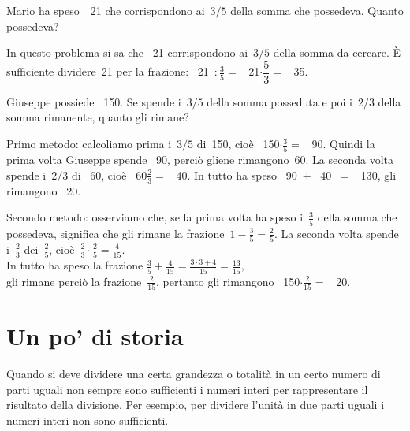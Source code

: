  \begin{esempio}{}{}
Mario ha speso~\officialeuro\ 21 che corrispondono ai~\(3/5\) della somma 
che possedeva. Quanto possedeva?

In questo problema si sa che \officialeuro\ 21 corrispondono ai~\(3/5\) della 
somma da cercare.
È sufficiente dividere~21 per la frazione:
\officialeuro\ 21~\(\displaystyle:\frac{3}{5}=\) \officialeuro\ 
21\(\cdot\dfrac{5}{3}=\) \officialeuro\ 35.
 \end{esempio}

 \begin{esempio}{}{}
Giuseppe possiede \officialeuro\ 150. Se spende i~\(3/5\) della somma 
posseduta e 
poi i~\(2/3\) della somma rimanente, quanto gli rimane?

Primo metodo: calcoliamo prima i~\(3/5\) di~150, cioè \officialeuro\ 
150\(\cdot\frac{3}{5}=\) 
\officialeuro\ 90.
Quindi la prima volta Giuseppe spende \officialeuro\ 90, perciò gliene 
rimangono~60. La seconda volta spende i~\(2/3\) di \officialeuro\ 60, 
cioè \officialeuro\ 60\(\frac{2}{3}=\) \officialeuro\ 40. In tutto ha speso
\officialeuro\ 90~\(+\) \officialeuro\ 40~\(=\) \officialeuro\ 130, gli 
rimangono \officialeuro\ 20.

Secondo metodo: osserviamo che,
se la prima volta ha speso i~\(\frac{3}{5}\) della somma che possedeva,
significa che gli rimane la frazione~\(1-\frac{3}{5}=\frac{2}{5}\).
La seconda volta spende i~\(\frac{2}{3}\) dei~\(\frac{2}{5}\), 
cioè~\(\frac{2}{3} \cdot \frac{2}{5} = \frac{4}{15}\).\\
In tutto ha speso la frazione \quad 
\(\frac{3}{5}+\frac{4}{15}=\frac{3\cdot3+4}{15}=\frac{13}{15},\)\\
gli rimane perciò la frazione~\(\frac{2}{15}\), pertanto gli rimangono 
\officialeuro\ 150\(\cdot\frac{2}{15}=\) \officialeuro\ 20.
 \end{esempio}



\section{Un po' di  storia}

Quando si deve dividere una certa grandezza o totalità in un certo numero di 
parti uguali non sempre sono sufficienti i numeri interi per rappresentare 
il risultato della divisione. Per esempio, per dividere l'unità in due parti 
uguali i numeri interi non sono sufficienti.


